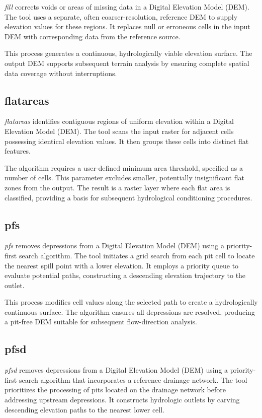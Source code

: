 \documentclass[
]{book}
\theoremstyle{definition}
\theoremstyle{definition}
\theoremstyle{definition}
\theoremstyle{definition}
\theoremstyle{remark}
\begin{document}
\emph{fill} corrects voids or areas of missing data in a Digital Elevation Model (DEM). The tool uses a separate, often coarser-resolution, reference DEM to supply elevation values for these regions. It replaces null or erroneous cells in the input DEM with corresponding data from the reference source.

This process generates a continuous, hydrologically viable elevation surface. The output DEM supports subsequent terrain analysis by ensuring complete spatial data coverage without interruptions.

\subsection{flatareas}\label{flatareas}

\emph{flatareas} identifies contiguous regions of uniform elevation within a Digital Elevation Model (DEM). The tool scans the input raster for adjacent cells possessing identical elevation values. It then groups these cells into distinct flat features.

The algorithm requires a user-defined minimum area threshold, specified as a number of cells. This parameter excludes smaller, potentially insignificant flat zones from the output. The result is a raster layer where each flat area is classified, providing a basis for subsequent hydrological conditioning procedures.

\subsection{pfs}\label{pfs}

\emph{pfs} removes depressions from a Digital Elevation Model (DEM) using a priority-first search algorithm. The tool initiates a grid search from each pit cell to locate the nearest spill point with a lower elevation. It employs a priority queue to evaluate potential paths, constructing a descending elevation trajectory to the outlet.

This process modifies cell values along the selected path to create a hydrologically continuous surface. The algorithm ensures all depressions are resolved, producing a pit-free DEM suitable for subsequent flow-direction analysis.

\subsection{pfsd}\label{pfsd}

\emph{pfsd} removes depressions from a Digital Elevation Model (DEM) using a priority-first search algorithm that incorporates a reference drainage network. The tool prioritizes the processing of pits located on the drainage network before addressing upstream depressions. It constructs hydrologic outlets by carving descending elevation paths to the nearest lower cell.
\end{document}
